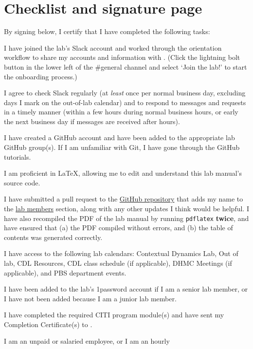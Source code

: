 \documentclass{tufte-book} %
\begin{document}
\chapter{Checklist and signature page}

   By signing below, I certify that I have completed the following tasks:
   \begin{todolist}
     \item I have joined the lab's Slack account and worked through the
    orientation workflow to share my accounts and information with
    \director.  (Click the lightning bolt button in the lower left of
    the \#general channel and select `Join the lab!' to start the
    onboarding process.)
    \item I agree to check Slack
    regularly (at \textit{least} once per normal business day, excluding days I
    mark on the out-of-lab calendar) and to respond to messages and
    requests in a timely manner (within a few hours during normal
    business hours, or early the next business day if messages are
    received after hours).
  \item I have created a GitHub account and have been added to the appropriate lab
    GitHub group(s).  If I am unfamiliar with Git, I have gone through
    the GitHub tutorials.
  \item I am proficient in \LaTeX, allowing me to edit and understand
  this lab manual's source code.
\item I have submitted a pull request to the
  \href{https://github.com/ContextLab/lab-manual}{GitHub repository}
  that adds my name to the \hyperref[sec:curr_members]{lab members}
  section, along with any other updates I think would be helpful.  I
  have also recompiled the PDF of the lab manual by running
  \texttt{pdflatex} \textbf{twice}, and have ensured that (a) the PDF compiled
  without errors, and (b) the table of contents was generated correctly.
  \item I have access to the following lab calendars:
    Contextual Dynamics Lab, Out of lab, CDL Resources, CDL class
    schedule (if applicable), DHMC Meetings (if
    applicable), and PBS department events.
  \item I have been added to the lab's 1password account if I am a
    senior lab member, or I have not been added because I am a junior
    lab member.
  \item I have completed the required CITI program module(s) and have
    sent my Completion Certificate(s) to \coordinator.
  \item I am an unpaid or salaried employee, or I am an hourly

\end{todolist}
\end{document}
